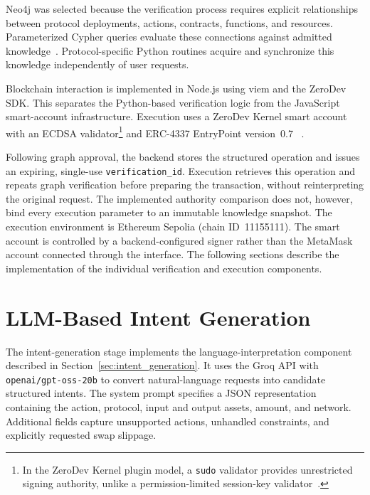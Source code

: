 Neo4j was selected because the verification process
requires explicit relationships between protocol
deployments, actions, contracts, functions, and resources.
Parameterized Cypher queries evaluate these connections
against admitted knowledge~\cite{implNeo4jCypher}.
Protocol-specific Python routines acquire and synchronize
this knowledge independently of user requests.

Blockchain interaction is implemented in Node.js using
viem and the ZeroDev SDK. This separates the Python-based
verification logic from the JavaScript smart-account
infrastructure. Execution uses a ZeroDev Kernel smart
account with an ECDSA validator\footnote{In the ZeroDev
Kernel plugin model, a \texttt{sudo} validator provides
unrestricted signing authority, unlike a permission-limited
session-key validator~\cite{implZeroDevPlugins}.}
and ERC-4337 EntryPoint version~0.7
~\cite{implZeroDevSDK,implERC4337}.

Following graph approval, the backend stores the structured
operation and issues an expiring, single-use
\texttt{verification\_id}. Execution retrieves this
operation and repeats graph verification before preparing
the transaction, without reinterpreting the original
request. The implemented authority comparison does not,
however, bind every execution parameter to an immutable
knowledge snapshot. The execution environment is Ethereum Sepolia
(chain ID~11155111). The smart account is controlled by
a backend-configured signer rather than the MetaMask
account connected through the interface. The following
sections describe the implementation of the individual
verification and execution components.



\section{LLM-Based Intent Generation}
\label{sec:llm_intent_generation}

The intent-generation stage implements the language-interpretation
component described in Section~\ref{sec:intent_generation}.
It uses the Groq API with \texttt{openai/gpt-oss-20b} to
convert natural-language requests into candidate structured
intents. The system prompt specifies a JSON representation
containing the action, protocol, input and output assets,
amount, and network. Additional fields capture unsupported
actions, unhandled constraints, and explicitly requested
swap slippage.

